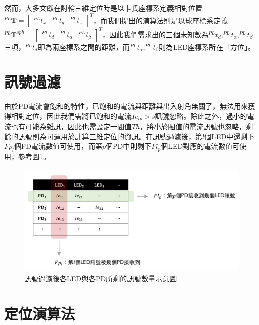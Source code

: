     然而，大多文獻在討輪三維定位時是以卡氏座標系定義相對位置$^{PL}\boldsymbol{T}=\left[\begin{array}{ccc}^{PL}t_x&^{PL}t_y&^{PL}t_z\end{array}\right]^T$，而我們提出的演算法則是以球座標系定義$^{PL}\boldsymbol{T}^{sph}=\left[\begin{array}{ccc}^{PL}t_d&^{PL}t_{\alpha}&^{PL}t_{\beta}\end{array}\right]^T$，因此我們需求出的三個未知數為$^{PL}t_d,^{PL}t_\alpha,^{PL}t_\beta$三項，$^{PL}t_d$即為兩座標系之間的距離，而$^{PL}t_{\alpha},^{PL}t_{\beta}$則為LED座標系所在「方位」。


\section{訊號過濾}
\label{chp:algorithm_filter}

由於PD電流會飽和的特性，已飽和的電流與距離與出入射角無關了，無法用來獲得相對定位，因此我們需將已飽和的電流$Ie_{lp}>s$訊號忽略。除此之外，過小的電流也有可能為雜訊，因此也需設定一閥值$Th$，將小於閥值的電流訊號也忽略，剩餘的訊號則為可運用於計算三維定位的資訊。在訊號過濾後，第$l$個LED中還剩下$Fp_l$個PD電流數值可使用，而第$p$個PD中則剩下$Fl_p$個LED對應的電流數值可使用，參考圖\ref{pic:after_filter}。

\begin{figure}[h!]
    \centering
    \includegraphics[width=15cm]{ch3pic/after_filter.png}
    \caption{訊號過濾後各LED與各PD所剩的訊號數量示意圖}
    \label{pic:after_filter}
\end{figure}

\section{定位演算法}
\label{chp:algorithm}

